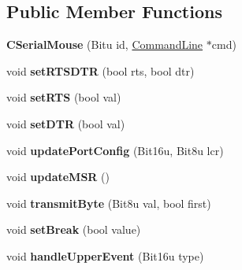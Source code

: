 \subsection*{Public Member Functions}
\begin{DoxyCompactItemize}
\item 
\hypertarget{classCSerialMouse_ad8ea74f5cd6916fc2fad0ab156fd25ec}{{\bfseries C\-Serial\-Mouse} (Bitu id, \hyperlink{classCommandLine}{Command\-Line} $\ast$cmd)}\label{classCSerialMouse_ad8ea74f5cd6916fc2fad0ab156fd25ec}

\item 
\hypertarget{classCSerialMouse_ad3c4bc01b47efa8b07e13cda6bad32a6}{void {\bfseries set\-R\-T\-S\-D\-T\-R} (bool rts, bool dtr)}\label{classCSerialMouse_ad3c4bc01b47efa8b07e13cda6bad32a6}

\item 
\hypertarget{classCSerialMouse_a9e1e2d4a7eb61767a04c6df69b21d102}{void {\bfseries set\-R\-T\-S} (bool val)}\label{classCSerialMouse_a9e1e2d4a7eb61767a04c6df69b21d102}

\item 
\hypertarget{classCSerialMouse_a6409e04e4c5c8d15706a72a5340f59be}{void {\bfseries set\-D\-T\-R} (bool val)}\label{classCSerialMouse_a6409e04e4c5c8d15706a72a5340f59be}

\item 
\hypertarget{classCSerialMouse_a6f4fe008180bd2bef5eac0a18ada3827}{void {\bfseries update\-Port\-Config} (Bit16u, Bit8u lcr)}\label{classCSerialMouse_a6f4fe008180bd2bef5eac0a18ada3827}

\item 
\hypertarget{classCSerialMouse_aecec2e372a2f5185119cb74f1b4bca93}{void {\bfseries update\-M\-S\-R} ()}\label{classCSerialMouse_aecec2e372a2f5185119cb74f1b4bca93}

\item 
\hypertarget{classCSerialMouse_ac5385cecbc9b750b30fd9ff8af026925}{void {\bfseries transmit\-Byte} (Bit8u val, bool first)}\label{classCSerialMouse_ac5385cecbc9b750b30fd9ff8af026925}

\item 
\hypertarget{classCSerialMouse_a7fecb5974e713f43cf6c663946dceb44}{void {\bfseries set\-Break} (bool value)}\label{classCSerialMouse_a7fecb5974e713f43cf6c663946dceb44}

\item 
\hypertarget{classCSerialMouse_a84300165413fad6e96fc3522ad32f37d}{void {\bfseries handle\-Upper\-Event} (Bit16u type)}\label{classCSerialMouse_a84300165413fad6e96fc3522ad32f37d}


\end{DoxyCompactItemize}
